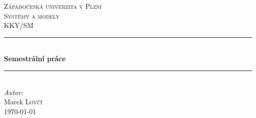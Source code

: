 	
\linespread{1}

\begin{titlepage}
	
	\newcommand{\HRule}{\rule{\linewidth}{0.5mm}} %
	
	\center{} %
	 
	
	\textsc{\LARGE Západočeská univerzita v Plzni}\\[1.5cm] %
	\textsc{\Large Systémy a modely}\\[0.5cm] %
	\textsc{\large KKY/SM}\\[0.5cm] %
	
	
	\HRule{} \\[0.4cm]
	{\huge \bfseries Semestrální práce}\\ %
	\HRule{} \\[1.5cm]
	 
	
	\Large \emph{Autor:}\\
	Marek \textsc{Lovčí}\\[3.3cm]
	
	
	{\large \today}\\[2cm] %
	
	

\end{titlepage}

